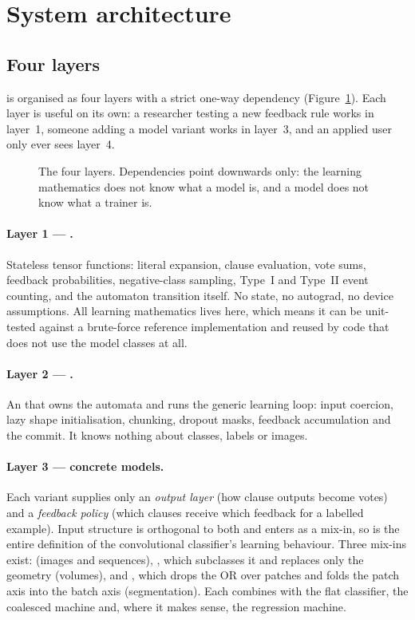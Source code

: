 \section{System architecture}
\label{sec:architecture}

\subsection{Four layers}

\ttlibname is organised as four layers with a strict one-way dependency
(Figure~\ref{fig:architecture}). Each layer is useful on its own: a researcher testing a new
feedback rule works in layer~1, someone adding a model variant works in layer~3, and an
applied user only ever sees layer~4.

\begin{figure}[htbp]
\centering
\resizebox{\linewidth}{!}{}
\caption{The four layers. Dependencies point downwards only: the learning mathematics does
  not know what a model is, and a model does not know what a trainer is.}
\label{fig:architecture}
\end{figure}

\paragraph{Layer 1 --- .}
Stateless tensor functions: literal expansion, clause evaluation, vote sums, feedback
probabilities, negative-class sampling, Type~I and Type~II event counting, and the automaton
transition itself. No state, no autograd, no device assumptions. All learning mathematics
lives here, which means it can be unit-tested against a brute-force reference implementation
and reused by code that does not use the model classes at all.

\paragraph{Layer 2 --- .}
An  that owns the automata and runs the generic learning loop: input
coercion, lazy shape initialisation, chunking, dropout masks, feedback accumulation and the
commit. It knows nothing about classes, labels or images.

\paragraph{Layer 3 --- concrete models.}
Each variant supplies only an \emph{output layer} (how clause outputs become votes) and a
\emph{feedback policy} (which clauses receive which feedback for a labelled example).
Input structure is orthogonal to both and enters as a mix-in, so
 is the entire definition of the
convolutional classifier's learning behaviour. Three mix-ins exist: 
(images and sequences), , which subclasses it and replaces only the
geometry (volumes), and , which drops the OR over patches and folds the
patch axis into the batch axis (segmentation). Each combines with the flat classifier, the
coalesced machine and, where it makes sense, the regression machine.

